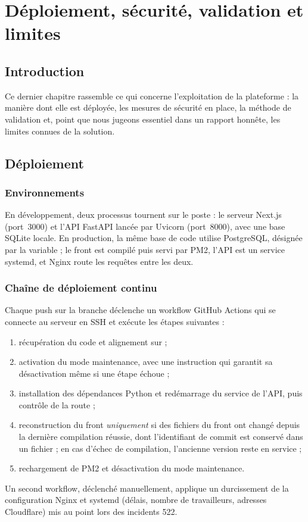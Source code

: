 \chapter{Déploiement, sécurité, validation et limites}\label{chap-deploiement}

\section{Introduction}
Ce dernier chapitre rassemble ce qui concerne l'exploitation de la plateforme : la manière dont elle est déployée, les mesures de sécurité en place, la méthode de validation et, point que nous jugeons essentiel dans un rapport honnête, les limites connues de la solution.

\section{Déploiement}

\subsection{Environnements}
En développement, deux processus tournent sur le poste : le serveur Next.js (port~3000) et l'API FastAPI lancée par Uvicorn (port~8000), avec une base SQLite locale. En production, la même base de code utilise PostgreSQL, désignée par la variable  ; le front est compilé puis servi par PM2, l'API est un service systemd, et Nginx route les requêtes entre les deux.

\subsection{Chaîne de déploiement continu}
Chaque push sur la branche  déclenche un workflow GitHub Actions qui se connecte au serveur en SSH et exécute les étapes suivantes :
\begin{enumerate}
  \item récupération du code et alignement sur  ;
  \item activation du mode maintenance, avec une instruction  qui garantit sa désactivation même si une étape échoue ;
  \item installation des dépendances Python et redémarrage du service de l'API, puis contrôle de la route  ;
  \item reconstruction du front \emph{uniquement} si des fichiers du front ont changé depuis la dernière compilation réussie, dont l'identifiant de commit est conservé dans un fichier  ; en cas d'échec de compilation, l'ancienne version reste en service ;
  \item rechargement de PM2 et désactivation du mode maintenance.
\end{enumerate}
Un second workflow, déclenché manuellement, applique un durcissement de la configuration Nginx et systemd (délais, nombre de travailleurs, adresses Cloudflare) mis au point lors des incidents 522.

